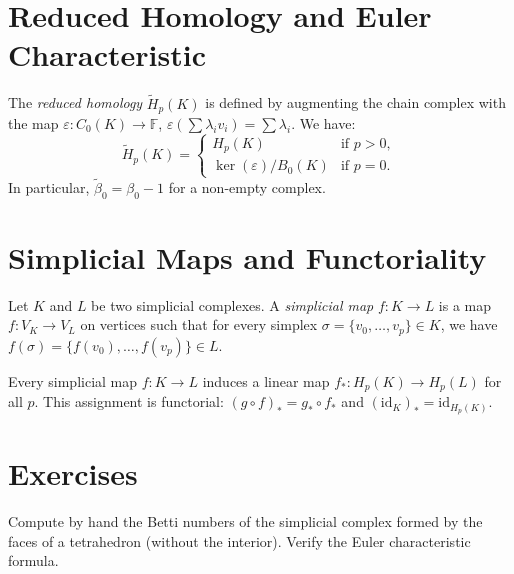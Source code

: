 \section{Reduced Homology and Euler Characteristic}

\begin{definition}
The \emph{reduced homology} $\tilde{H}_p(K)$ is defined by augmenting
the chain complex with the map
$\varepsilon : C_0(K) \to \mathbb{F}$,
$\varepsilon(\sum \lambda_i v_i) = \sum \lambda_i$. We have:
\[
  \tilde{H}_p(K) = \begin{cases}
    H_p(K) & \text{if } p > 0, \\
    \ker(\varepsilon) / B_0(K) & \text{if } p = 0.
  \end{cases}
\]
In particular, $\tilde{\beta}_0 = \beta_0 - 1$ for a non-empty complex.
\end{definition}

\section{Simplicial Maps and Functoriality}

\begin{definition}
Let $K$ and $L$ be two simplicial complexes. A \emph{simplicial map}
$f : K \to L$ is a map $f : V_K \to V_L$ on vertices such that for
every simplex $\sigma = \{v_0, \ldots, v_p\} \in K$, we have
$f(\sigma) = \{f(v_0), \ldots, f(v_p)\} \in L$.
\end{definition}

\begin{proposition}
Every simplicial map $f : K \to L$ induces a linear map
$f_* : H_p(K) \to H_p(L)$ for all $p$. This assignment is functorial:
$(g \circ f)_* = g_* \circ f_*$ and
$(\mathrm{id}_K)_* = \mathrm{id}_{H_p(K)}$.
\end{proposition}

\section{Exercises}

\begin{exercise}
Compute by hand the Betti numbers of the simplicial complex formed by
the faces of a tetrahedron (without the interior). Verify the Euler
characteristic formula.
\end{exercise}


